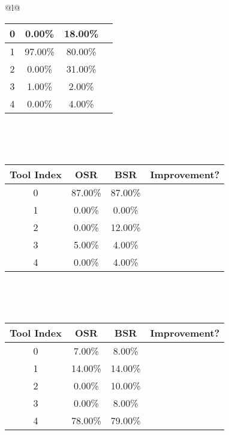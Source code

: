 \begin{longtable}{@{}l@{}}
\begin{minipage}{\textwidth}
\begin{tabular}{|c|c|c|c|}
0 & 0.00\% & 18.00\% & \textcolor{green}{\ding{51}} \\ \hline
1 & 97.00\% & 80.00\% & \textcolor{red}{\ding{55}} \\ \hline
2 & 0.00\% & 31.00\% & \textcolor{green}{\ding{51}} \\ \hline
3 & 1.00\% & 2.00\% & \textcolor{green}{\ding{51}} \\ \hline
4 & 0.00\% & 4.00\% & \textcolor{green}{\ding{51}} \\ \hline
\end{tabular}
\end{minipage}\\[2ex]
\begin{minipage}{\textwidth}
\centering\vspace{2ex}
\\[0.8ex]
\begin{tabular}{|c|c|c|c|} \hline
\textbf{Tool Index} & \textbf{OSR} & \textbf{ BSR} & \textbf{Improvement?} \\ \hline
0 & 87.00\% & 87.00\% & \textcolor{red}{\ding{55}} \\ \hline
1 & 0.00\% & 0.00\% & \textcolor{red}{\ding{55}} \\ \hline
2 & 0.00\% & 12.00\% & \textcolor{green}{\ding{51}} \\ \hline
3 & 5.00\% & 4.00\% & \textcolor{red}{\ding{55}} \\ \hline
4 & 0.00\% & 4.00\% & \textcolor{green}{\ding{51}} \\ \hline
\end{tabular}
\end{minipage}\\[2ex]
\begin{minipage}{\textwidth}
\centering\vspace{2ex}
\\[0.8ex]
\begin{tabular}{|c|c|c|c|} \hline
\textbf{Tool Index} & \textbf{OSR} & \textbf{ BSR} & \textbf{Improvement?} \\ \hline
0 & 7.00\% & 8.00\% & \textcolor{green}{\ding{51}} \\ \hline
1 & 14.00\% & 14.00\% & \textcolor{red}{\ding{55}} \\ \hline
2 & 0.00\% & 10.00\% & \textcolor{green}{\ding{51}} \\ \hline
3 & 0.00\% & 8.00\% & \textcolor{green}{\ding{51}} \\ \hline
4 & 78.00\% & 79.00\% & \textcolor{green}{\ding{51}} \\ \hline

\end{tabular}
\end{minipage}
\end{longtable}
